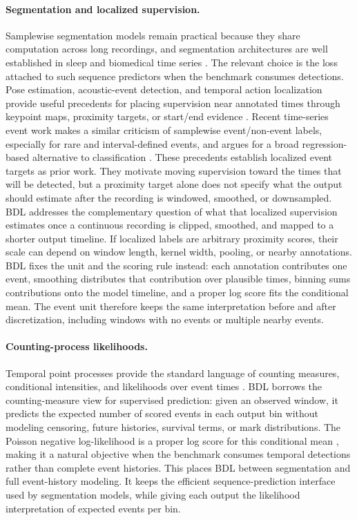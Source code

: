 \paragraph{Segmentation and localized supervision.}
Samplewise segmentation models remain practical because they share computation across long recordings, and segmentation architectures are well established in sleep and biomedical time series \citep{supratak2017,perslev2019,phan2019,ronneberger2015}.
The relevant choice is the loss attached to such sequence predictors when the benchmark consumes detections.
Pose estimation, acoustic-event detection, and temporal action localization provide useful precedents for placing supervision near annotated times through keypoint maps, proximity targets, or start/end evidence \citep{newell2016stacked,xiao2018simple,luo2021,yu2022,phan2015,gao2017turn,lin2018bsn,lin2019bmn}.
Recent time-series event work makes a similar criticism of samplewise event/non-event labels, especially for rare and interval-defined events, and argues for a broad regression-based alternative to classification \citep{azib2023universal}.
These precedents establish localized event targets as prior work.
They motivate moving supervision toward the times that will be detected, but a proximity target alone does not specify what the output should estimate after the recording is windowed, smoothed, or downsampled.
BDL addresses the complementary question of what that localized supervision estimates once a continuous recording is clipped, smoothed, and mapped to a shorter output timeline.
If localized labels are arbitrary proximity scores, their scale can depend on window length, kernel width, pooling, or nearby annotations.
BDL fixes the unit and the scoring rule instead: each annotation contributes one event, smoothing distributes that contribution over plausible times, binning sums contributions onto the model timeline, and a proper log score fits the conditional mean.
The event unit therefore keeps the same interpretation before and after discretization, including windows with no events or multiple nearby events.

\paragraph{Counting-process likelihoods.}
Temporal point processes provide the standard language of counting measures, conditional intensities, and likelihoods over event times \citep{kingman1993,du2016rmtpp,mei2017neural,shchur2021neural}.
BDL borrows the counting-measure view for supervised prediction: given an observed window, it predicts the expected number of scored events in each output bin without modeling censoring, future histories, survival terms, or mark distributions.
The Poisson negative log-likelihood is a proper log score for this conditional mean \citep{gneiting2007proper}, making it a natural objective when the benchmark consumes temporal detections rather than complete event histories.
This places BDL between segmentation and full event-history modeling.
It keeps the efficient sequence-prediction interface used by segmentation models, while giving each output the likelihood interpretation of expected events per bin.
